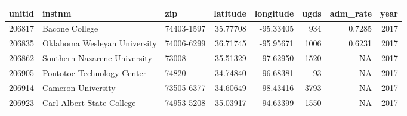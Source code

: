 \documentclass[
]{article}
\begin{document}
\begin{tabular}{r|l|l|r|r|r|r|r}
\hline
unitid & instnm & zip & latitude & longitude & ugds & adm\_rate & year\\
\hline
206817 & Bacone College & 74403-1597 & 35.77708 & -95.33405 & 934 & 0.7285 & 2017\\
\hline
206835 & Oklahoma Wesleyan University & 74006-6299 & 36.71745 & -95.95671 & 1006 & 0.6231 & 2017\\
\hline
206862 & Southern Nazarene University & 73008 & 35.51329 & -97.62950 & 1520 & NA & 2017\\
\hline
206905 & Pontotoc Technology Center & 74820 & 34.74840 & -96.68381 & 93 & NA & 2017\\
\hline
206914 & Cameron University & 73505-6377 & 34.60649 & -98.43416 & 3793 & NA & 2017\\
\hline
206923 & Carl Albert State College & 74953-5208 & 35.03917 & -94.63399 & 1550 & NA & 2017\\
\hline
\end{tabular}
\end{document}
